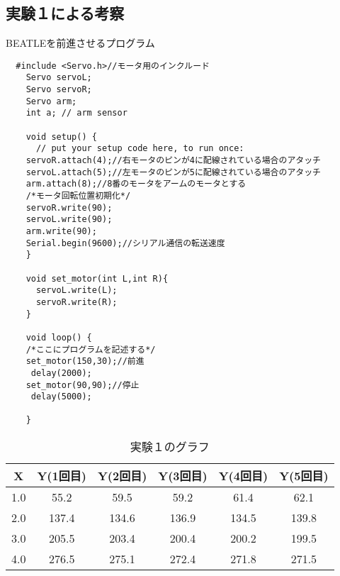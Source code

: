 \documentclass{jsarticle}
\begin{document}
\subsection{実験１による考察}
BEATLEを前進させるプログラム
  \begin{verbatim}
  #include <Servo.h>//モータ用のインクルード
    Servo servoL;
    Servo servoR;
    Servo arm;
    int a; // arm sensor

    void setup() {
      // put your setup code here, to run once:
    servoR.attach(4);//右モータのピンが4に配線されている場合のアタッチ
    servoL.attach(5);//左モータのピンが5に配線されている場合のアタッチ
    arm.attach(8);//8番のモータをアームのモータとする
    /*モータ回転位置初期化*/
    servoR.write(90);
    servoL.write(90);
    arm.write(90);
    Serial.begin(9600);//シリアル通信の転送速度
    }

    void set_motor(int L,int R){
      servoL.write(L);
      servoR.write(R);
    }

    void loop() {
    /*ここにプログラムを記述する*/
    set_motor(150,30);//前進
     delay(2000);
    set_motor(90,90);//停止
     delay(5000);

    }
  \end{verbatim}
\begin{table}[htbp]
  \begin{center}
      \caption{実験１のグラフ}
          \begin{tabular}{c|c|c|c|c|c}
            \hline
            X & Y(1回目) & Y(2回目) & Y(3回目) & Y(4回目) & Y(5回目) \\ \hline \hline
            1.0 & 55.2 & 59.5 & 59.2 & 61.4 & 62.1 \\
            2.0 & 137.4 & 134.6 & 136.9 & 134.5 & 139.8 \\
            3.0 & 205.5 & 203.4 & 200.4 & 200.2 & 199.5 \\
            4.0 & 276.5 & 275.1 & 272.4 & 271.8 & 271.5  \\
            \hline
          \end{tabular}
  \end{center}
\end{table}
\end{document}
